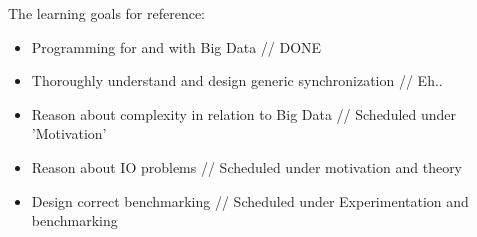 \documentclass[a4paper]{article}
\begin{document}
The learning goals for reference:

\begin{itemize}
  \item Programming for and with Big Data  // DONE
  \item Thoroughly understand and design generic synchronization  // Eh..
  \item Reason about complexity in relation to Big Data // Scheduled under 'Motivation'
  \item Reason about IO problems  // Scheduled under motivation and theory
  \item Design correct benchmarking  // Scheduled under Experimentation and benchmarking
\end{itemize}
\end{document}
